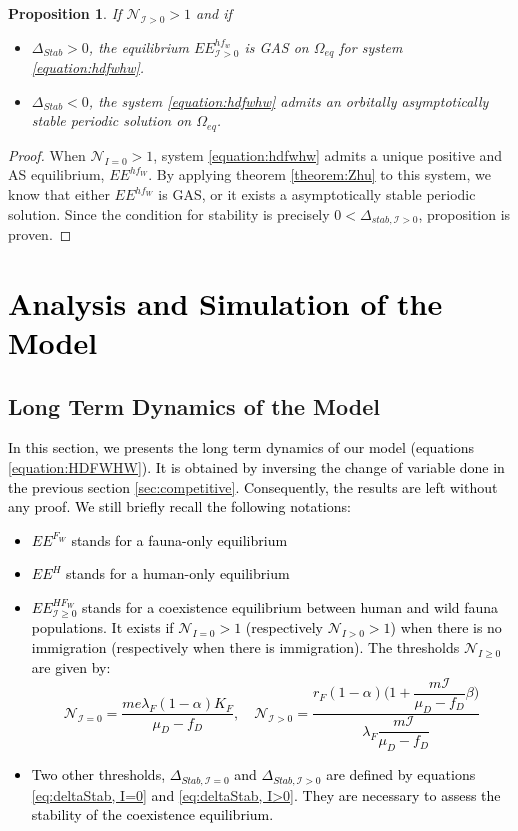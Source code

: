 \documentclass{article}
\newcommand{\lfw}{\lambda_{F}}
\newcommand{\lfw}{\lambda_{F}}
\newcommand{\cI}{\mathcal{I}}
\newcommand{\N}{\mathcal{N}}
\newcommand{\vtrois}[1]{\textcolor{black}{#1}}
\newtheorem{prop}[theorem]{Proposition}
\theoremstyle{definition}
\theoremstyle{remark}
\begin{document}
\begin{prop} \label{prop:limitCycle, cI>0}
If $\mathcal{N}_{\cI > 0} > 1$ and if 

\begin{itemize}
\item $\Delta_{Stab} > 0$, the equilibrium $EE^{hf_w}_{\cI >0}$ is GAS on $\Omega_{eq}$ for system \eqref{equation:hdfwhw}.
\item $\Delta_{Stab} < 0$, the system \eqref{equation:hdfwhw} admits an orbitally asymptotically stable periodic solution on $\Omega_{eq}$.
\end{itemize}
\end{prop}

\begin{proof}
When $\mathcal{N}_{I =0} > 1$, system \eqref{equation:hdfwhw} admits a unique positive and AS equilibrium, $EE^{hf_W}$. By applying theorem \ref{theorem:Zhu} to this system, we know that either $EE^{hf_W}$ is GAS, or it exists a asymptotically stable periodic solution. Since the condition for stability is precisely $0 < \Delta_{stab, \cI > 0}$, proposition is proven. 
\end{proof}

\section{\vtrois{Analysis and Simulation of the Model}}


\subsection{Long Term Dynamics of the Model}

\vtrois{
In this section, we presents the long term dynamics of our model (equations \eqref{equation:HDFWHW}). It is obtained by inversing the change of variable done in the previous section \ref{sec:competitive}. Consequently, the results are left without any proof. We still briefly recall the following notations:
\begin{itemize}
\item $EE^{F_W}$ stands for a fauna-only equilibrium
\item $EE^{H}$ stands for a human-only equilibrium
\item $EE^{HF_W}_{\cI \geq 0}$ stands for a coexistence equilibrium between human and wild fauna populations. It exists if $\N_{I = 0} > 1$ (respectively $\N_{I > 0} > 1$) when there is no immigration (respectively when there is immigration). The thresholds $\N_{I \geq 0}$ are given by:
$$
\mathcal{N}_{\cI = 0} = \dfrac{m e \lfw (1-\alpha)K_F}{\mu_D - f_D}, \quad \mathcal{N}_{\cI >0} =\dfrac{r_F(1-\alpha)\Big({1 + \dfrac{m\cI}{\mu_D - f_D}\beta\Big)}}{\lfw\dfrac{m\cI}{\mu_D - f_D}}
$$
\item Two other thresholds, $\Delta_{Stab, \cI = 0}$ and $\Delta_{Stab, \cI > 0}$ are defined by equations \eqref{eq:deltaStab, I=0} and \eqref{eq:deltaStab, I>0}. They are necessary to assess the stability of the coexistence equilibrium.
\end{itemize}
}
\end{document}
